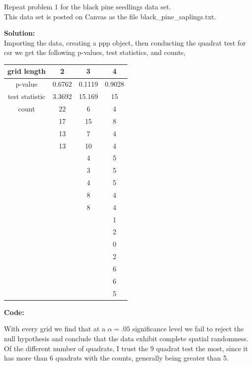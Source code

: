\documentclass[12pt]{article}
\makeatletter
\theoremstyle{homework}
\newenvironment{exercise}[1]
{\def\@currentlabel{#1}\exercisecore}
{\endexercisecore}
\newcommand{\localhead}[1]{\par\smallskip\noindent\textbf{#1}\nobreak\\}%
\newcommand\solution{\localhead{Solution:}}
\makeatother
\begin{document}
\vspace{.5in}






\begin{exercise}{3} Repeat problem 1 for the black pine seedlings data set.\\
  This data set is posted on Canvas as the file black\_pine\_saplings.txt.\\
  \solution Importing the data, creating a ppp object, then conducting the quadrat test for csr we get the following p-values, test statistics, and counts,


  \begin{center}
    \begin{tabular}{c|| c c c}
        grid length & 2 & 3 & 4\\
      \hline 
      p-value        &  0.6762 & 0.1119   &  0.9028\\
      test statistic &  3.3692 & 15.169   &  15\\
      count          & 22      &  6       & 4\\
                     & 17      &  15      & 8\\
                     & 13      &  7       & 4\\
                     & 13      &  10      & 4\\
                     &         &  4       & 5\\
                     &         &  3       & 5\\
                     &         &  4       & 5\\
                     &         &  8       & 4\\                     
                     &         &  8       & 4\\  
                     &         &          & 1\\          
                     &         &          & 2\\          
                     &         &          & 0\\                     
                     &         &          & 2\\ 
                     &         &          & 6\\          
                     &         &          & 6\\          
                     &         &          & 5\\     
     \end{tabular}
    \end{center}
    \textbf{Code:}
    \begin{center}
    
    \end{center}

    With every grid we find that at a $\alpha = .05$ significance level we fail to reject the null hypothesis and conclude that the data exhibit complete spatial randomness. 
    Of the different number of quadrats, I trust the 9 quadrat test the most, since it has more than 6 quadrats with the counts, generally being greater than 5. 
\end{exercise}
\end{document}
